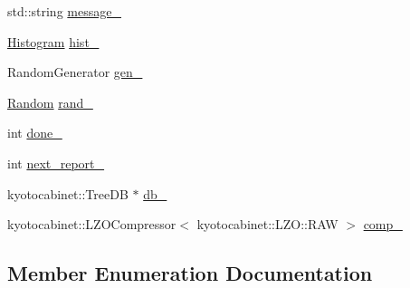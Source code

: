 \begin{DoxyCompactItemize}
std\+::string \hyperlink{classleveldb_1_1_benchmark_aea491ad3eeaa61dab1a3dd4e2b55265a}{message\+\_\+}
\item 
\hyperlink{classleveldb_1_1_histogram}{Histogram} \hyperlink{classleveldb_1_1_benchmark_ab874c6e3492347d1287f711d82d87fd5}{hist\+\_\+}
\item 
Random\+Generator \hyperlink{classleveldb_1_1_benchmark_a988990f038394e3e20b68c9276b8f954}{gen\+\_\+}
\item 
\hyperlink{classleveldb_1_1_random}{Random} \hyperlink{classleveldb_1_1_benchmark_a86331cf7ff255c11dc1142fad198023f}{rand\+\_\+}
\item 
int \hyperlink{classleveldb_1_1_benchmark_a435c05829486b521db35dbe88f9085f3}{done\+\_\+}
\item 
int \hyperlink{classleveldb_1_1_benchmark_ade1416947e54bb1497240c9b69e24e72}{next\+\_\+report\+\_\+}
\item 
kyotocabinet\+::\+Tree\+D\+B $\ast$ \hyperlink{classleveldb_1_1_benchmark_ac287bb1d708f5e4859ef6633f3769a0c}{db\+\_\+}
\item 
kyotocabinet\+::\+L\+Z\+O\+Compressor$<$ kyotocabinet\+::\+L\+Z\+O\+::\+R\+A\+W $>$ \hyperlink{classleveldb_1_1_benchmark_aa81b0851626974e65e302735393c937d}{comp\+\_\+}
\end{DoxyCompactItemize}


\subsection{Member Enumeration Documentation}
\hypertarget{classleveldb_1_1_benchmark_ad94bd817d74359a4d8cea6da609a28d4}{}
